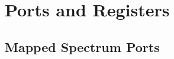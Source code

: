\section{Ports and Registers}
\label{zx_next_ports}


\newcommand{\ZXSee}[1]{(see section \PortXRef{#1})}

\subsection{Mapped Spectrum Ports}

\begingroup
	\newcommand{\zxport}[4]{
		\tt {#1} & 
		{\tt \$#2} & 
		\IfEq{#3}{}{}{\tt \%#3} &
		#4\\
	}

	\setlength{\extrarowheight}{5pt}	%

